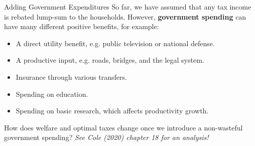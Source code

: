 \documentclass[10pt,c,aspectratio=1610,handout]{beamer}
\begin{document}
\begin{frame}{Adding Government Expenditures}%
  So far, we have assumed that any tax income is rebated lump-sum to the households. However, \textbf{government spending} can have many different positive benefits, for example:%
  \vspace*{0.1in}%
  \begin{itemize}%
    \item[$\blacktriangleright$] A direct utility benefit, e.g. public television or national defense.%
    \item[$\blacktriangleright$] A productive input, e.g. roads, bridges, and the legal system.%
    \item[$\blacktriangleright$] Insurance through various transfers.%
    \item[$\blacktriangleright$] Spending on education.%
    \item[$\blacktriangleright$] Spending on basic research, which affects productivity growth.%
  \end{itemize}%
  \vspace*{0.2in}%
  \pause%
  How does welfare and optimal taxes change once we introduce a non-wasteful government spending? \emph{See Cole (2020) chapter 18 for an analysis!}%
\end{frame}%
\end{document}

